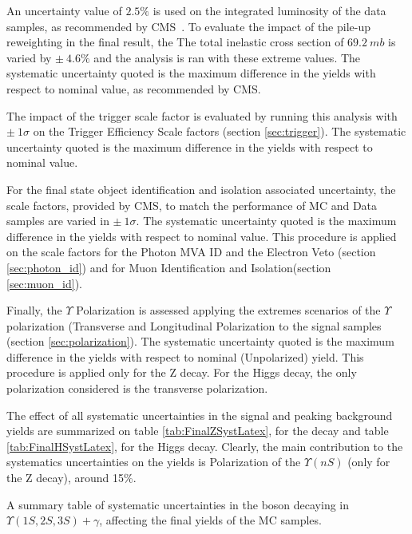 An uncertainty value of $2.5\%$ is used on the integrated luminosity of the data samples, as recommended by CMS~\cite{CMS-PAS-LUM-17-001}. To evaluate the impact of the pile-up reweighting in the final result, the The total inelastic cross section of $69.2~mb$ is varied by $\pm~4.6\%$ and the analysis is ran with these extreme values. The systematic uncertainty quoted is the maximum difference in the yields with respect to nominal value, as recommended by CMS. 

The impact of the trigger scale factor is evaluated by running this analysis with $\pm~1\sigma$ on the Trigger Efficiency Scale factors (section \ref{sec:trigger}). The systematic uncertainty quoted is the maximum difference in the yields with respect to nominal value.

For the final state object identification and isolation associated uncertainty, the scale factors, provided by CMS, to match the performance of MC and Data samples are varied in  $\pm~1\sigma$. The systematic uncertainty quoted is the maximum difference in the yields with respect to nominal value. This procedure is applied on the scale factors for the Photon MVA ID and the Electron Veto (section \ref{sec:photon_id}) and for  Muon Identification and Isolation(section \ref{sec:muon_id}). 

Finally, the $\Upsilon$ Polarization is assessed applying the extremes scenarios of the $\Upsilon$ polarization (Transverse and Longitudinal Polarization to the signal samples (section \ref{sec:polarization}). The systematic uncertainty quoted is the maximum difference in the yields with respect to nominal (Unpolarized) yield. This procedure is applied only for the Z decay. For the Higgs decay, the only polarization considered is the transverse polarization.

The effect of all systematic uncertainties in the signal and peaking background yields are summarized on table \ref{tab:FinalZSystLatex}, for the \Z decay and table \ref{tab:FinalHSystLatex}, for the Higgs decay. Clearly, the main contribution to the systematics uncertainties on the yields is Polarization of the $\Upsilon(nS)$ (only for the Z decay), around 15\%.

\begin{table}[ht]
  \begin{center}
    \caption{ A summary table of systematic uncertainties in the \Z boson decaying in $\Upsilon(1S,2S,3S) + \gamma$, affecting the final yields of the MC samples.}
    
    \label{tab:FinalZSystLatex}
  \end{center}
\end{table}


